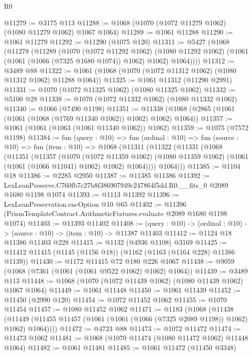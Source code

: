 \begin{lexlean}{R0}
\begin{coremodule}
@11279 := @3175 @113
@11288 := @1068 (@1070 (@1072 @11279 @1062) (@1080 @11279 @1062) @1067 @1064)
@11289 := @1061 @11288
@11290 := @1061 @11279
@11292 := @11290 (@1075 @120)
@11311 := @5427
    (@1068
      (@11278
        (@11289
          (@1070
            (@1072 @11292 @1062)
            (@1080 @11292 @1062)
            (@1061 (@1061 (@1066 (@7325 @1680 @1074)) @1062) @1062)
            @1064))))
@11312 := @3489 @88
@11322 := @1061 (@1068 (@1070 (@1072 @11312 @1062) (@1080 @11312 @1062) @11288 @1064))
@11325 := @1061 @11312 (@11290 @2991)
@11331 := @1070 (@1072 @11325 @1062) (@1080 @11325 @1062)
@11332 := @5100 @28
@11338 := @1070 (@1072 @11332 @1062) (@1080 @11332 @1062)
@11340 := @1066 (@7490 @1198)
@11351 := @11338 (@1068 (@2865 (@1061 (@1061 (@1068 (@1769 @11340 @1062)) @1062) @1062) @1064))
@11357 := @1061 (@1061 (@1063 (@1061 @11340 @1062)) @1062)
@11359 := @1075 (@7572 @1198)
@11384 := fun (query : @10) =>
  fun (ordinal : @10) =>
  fun (source : @10) =>
  fun (item : @10) =>
  @1068
    (@11311
      (@11322
        (@11331
          (@1068
            (@11351
              (@11357
                (@1070
                  (@1072 @11359 @1062)
                  (@1080 @11359 @1062)
                  (@1061 (@1061 (@1066 @11041) @1062) @1062)
                  @1064))))
          @1064)))
@11385 := @1104 @18
@11386 := @2285 @2950
@11387 := @11385 @11386
@11392 := LexLeanPreserve.C760fb7c27b8f386907949c247864f5dd.R0.__fits_0 @2089 @1680 @1198 @1074
@11393 := @1113 @11392
@11396 := LexLeanPreservation.encOption @10 @65
@11402 := @11396 (PrismTemplateContract.ArithmeticFixtures.evaluate @2089 @1680 @1198 @1074)
@11403 := @11393 @11402
@11408 := (query : @10) -> (ordinal : @10) -> (source : @10) -> (item : @10) -> @11387 @11403
@11412 := @1124 @18 @11386 @11403 @228
@11415 := @1132 (@4936 @1108) @3169
@11425 := @11412 @11415 (@1145 (@1156 @18)) (@1162 (@1163 (@1164 @228) @11386 @1139))
@11430 := @1172 @11415 @72 @180 @226 @1067
@11438 := @9059 (@1068 (@7361 (@1061 (@1061 @9522 @1062) @1062) @1064))
@11439 := @3489 @113
@11448 := @1068 (@1070 (@1072 @11439 @1062) (@1080 @11439 @1062) @1067 @1064)
@11449 := @1061 @11448
@11450 := @1061 @11439
@11452 := @11450 (@2990 @120)
@11454 := @1072 @11452 @1062
@11455 := @1070 @11454
@11457 := @1080 @11452 @1062
@11471 := @1183
    (@1068
      (@11438
        (@11449 (@11455 @11457 (@1061 (@1061 (@1066 (@7325 @2089 @1198)) @1062) @1062) @1064))))
@11472 := @4723 @88
@11473 := @1072 @11472
@11474 := @11473 @1062
@11481 := @1068 (@1070 @11474 (@1080 @11472 @1062) @11448 @1064)
@11482 := @1061 @11481
@11485 := @1061 @11472 (@11450 @3348)

\end{coremodule}
\end{lexlean}
